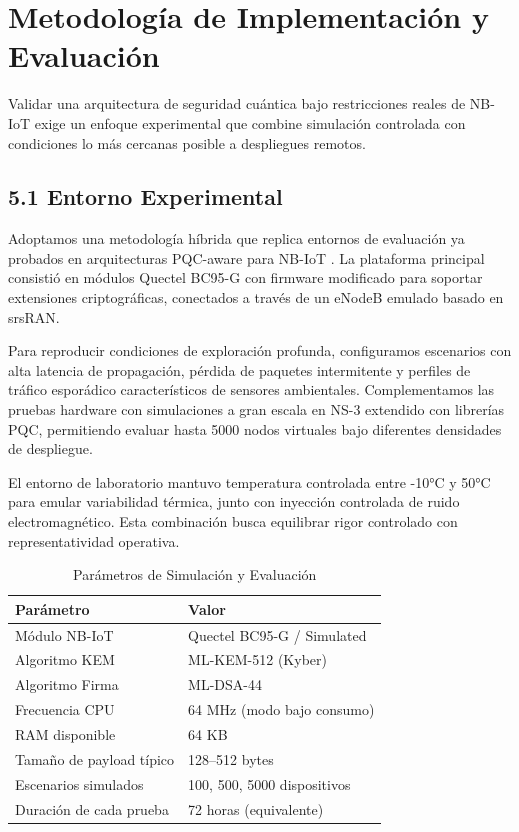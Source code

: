 \section{Metodología de Implementación y Evaluación}

Validar una arquitectura de seguridad cuántica bajo restricciones reales de NB-IoT exige un enfoque experimental que combine simulación controlada con condiciones lo más cercanas posible a despliegues remotos.

\subsection{5.1 Entorno Experimental}

Adoptamos una metodología híbrida que replica entornos de evaluación ya probados en arquitecturas PQC-aware para NB-IoT \cite{Do2026_PQCAware}. La plataforma principal consistió en módulos Quectel BC95-G con firmware modificado para soportar extensiones criptográficas, conectados a través de un eNodeB emulado basado en srsRAN. 

Para reproducir condiciones de exploración profunda, configuramos escenarios con alta latencia de propagación, pérdida de paquetes intermitente y perfiles de tráfico esporádico característicos de sensores ambientales. Complementamos las pruebas hardware con simulaciones a gran escala en NS-3 extendido con librerías PQC, permitiendo evaluar hasta 5000 nodos virtuales bajo diferentes densidades de despliegue.

El entorno de laboratorio mantuvo temperatura controlada entre -10°C y 50°C para emular variabilidad térmica, junto con inyección controlada de ruido electromagnético. Esta combinación busca equilibrar rigor controlado con representatividad operativa.

\begin{table}[t]
\centering
\caption{Parámetros de Simulación y Evaluación}
\label{tab:parametros}
\begin{tabular}{|l|l|}
\hline
\textbf{Parámetro} & \textbf{Valor} \\
\hline
Módulo NB-IoT & Quectel BC95-G / Simulated \\
\hline
Algoritmo KEM & ML-KEM-512 (Kyber) \\
\hline
Algoritmo Firma & ML-DSA-44 \\
\hline
Frecuencia CPU & 64 MHz (modo bajo consumo) \\
\hline
RAM disponible & 64 KB \\
\hline
Tamaño de payload típico & 128--512 bytes \\
\hline
Escenarios simulados & 100, 500, 5000 dispositivos \\
\hline
Duración de cada prueba & 72 horas (equivalente) \\
\hline
\end{tabular}
\end{table}

